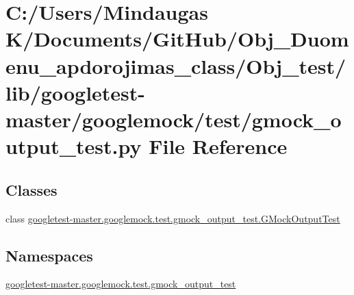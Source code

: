 \hypertarget{_obj__test_2lib_2googletest-master_2googlemock_2test_2gmock__output__test_8py}{}\section{C\+:/\+Users/\+Mindaugas K/\+Documents/\+Git\+Hub/\+Obj\+\_\+\+Duomenu\+\_\+apdorojimas\+\_\+class/\+Obj\+\_\+test/lib/googletest-\/master/googlemock/test/gmock\+\_\+output\+\_\+test.py File Reference}
\label{_obj__test_2lib_2googletest-master_2googlemock_2test_2gmock__output__test_8py}
\subsection*{Classes}
\begin{DoxyCompactItemize}
\item 
class \mbox{\hyperlink{classgoogletest-master_1_1googlemock_1_1test_1_1gmock__output__test_1_1_g_mock_output_test}{googletest-\/master.\+googlemock.\+test.\+gmock\+\_\+output\+\_\+test.\+G\+Mock\+Output\+Test}}
\end{DoxyCompactItemize}
\subsection*{Namespaces}
\begin{DoxyCompactItemize}
\item 
 \mbox{\hyperlink{namespacegoogletest-master_1_1googlemock_1_1test_1_1gmock__output__test}{googletest-\/master.\+googlemock.\+test.\+gmock\+\_\+output\+\_\+test}}
\end{DoxyCompactItemize}
